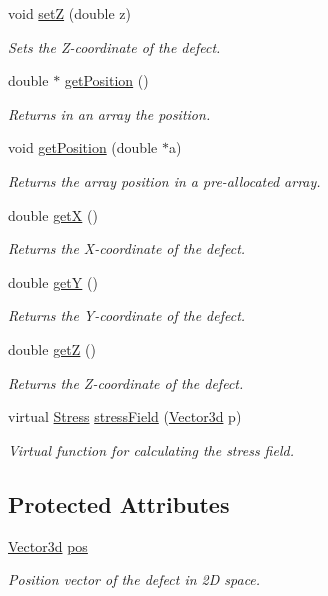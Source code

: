 \begin{DoxyCompactItemize}
void \hyperlink{classDefect_abb0b16c44a1b04d782f5c5f598b49d5b}{set\-Z} (double z)
\begin{DoxyCompactList}\small\item\em Sets the Z-\/coordinate of the defect. \end{DoxyCompactList}\item 
double $\ast$ \hyperlink{classDefect_a6842fba3ad14032766ccf0437afcbced}{get\-Position} ()
\begin{DoxyCompactList}\small\item\em Returns in an array the position. \end{DoxyCompactList}\item 
void \hyperlink{classDefect_aace5c752b85c368631746abc3d5bd714}{get\-Position} (double $\ast$a)
\begin{DoxyCompactList}\small\item\em Returns the array position in a pre-\/allocated array. \end{DoxyCompactList}\item 
double \hyperlink{classDefect_a01b96c453c13db82b5835682e1849dc0}{get\-X} ()
\begin{DoxyCompactList}\small\item\em Returns the X-\/coordinate of the defect. \end{DoxyCompactList}\item 
double \hyperlink{classDefect_a9ea8df3b4c621762a327813056e63911}{get\-Y} ()
\begin{DoxyCompactList}\small\item\em Returns the Y-\/coordinate of the defect. \end{DoxyCompactList}\item 
double \hyperlink{classDefect_a6f59edeca7ca8bfa01c54fd6b1a62374}{get\-Z} ()
\begin{DoxyCompactList}\small\item\em Returns the Z-\/coordinate of the defect. \end{DoxyCompactList}\item 
virtual \hyperlink{classStress}{Stress} \hyperlink{classDefect_af25282562571e6fe3340e82d02c7ae93}{stress\-Field} (\hyperlink{classVector3d}{Vector3d} p)
\begin{DoxyCompactList}\small\item\em Virtual function for calculating the stress field. \end{DoxyCompactList}\end{DoxyCompactItemize}
\subsection*{Protected Attributes}
\begin{DoxyCompactItemize}
\item 
\hyperlink{classVector3d}{Vector3d} \hyperlink{classDefect_aed2731c1beefc22e3db6ad5b18194cdd}{pos}
\begin{DoxyCompactList}\small\item\em Position vector of the defect in 2\-D space. \end{DoxyCompactList}\end{DoxyCompactItemize}


